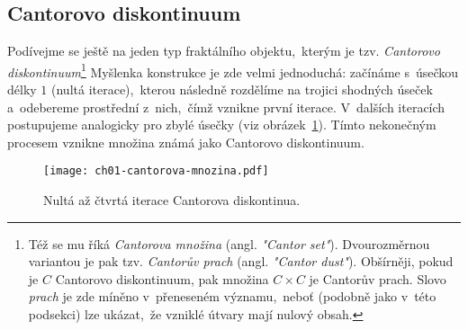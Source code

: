 \subsection{Cantorovo diskontinuum}\label{subsec:cantorovo_diskontinuum}
Podívejme se ještě na jeden typ fraktálního objektu,~kterým je tzv. \emph{Cantorovo diskontinuum}\footnote{Též se mu říká \emph{Cantorova množina} (angl. \emph{"Cantor set"}). Dvourozměrnou variantou je pak tzv. \emph{Cantorův prach} (angl. \emph{"Cantor dust"}). Obšírněji, pokud je $C$ Cantorovo diskontinuum, pak množina $C\times C$ je Cantorův prach. Slovo \emph{prach} je zde míněno v~přeneseném významu,~neboť (podobně jako v~této podsekci) lze ukázat,~že vzniklé útvary mají nulový obsah.} Myšlenka konstrukce je zde velmi jednoduchá: začínáme s~úsečkou délky $1$ (nultá iterace),~kterou následně rozdělíme na trojici shodných úseček a~odebereme prostřední z~nich,~čímž vznikne první iterace. V~dalších iteracích postupujeme analogicky pro zbylé úsečky (viz obrázek~\ref{fig:cantorovo_diskontinuum}). Tímto nekonečným procesem vznikne množina známá jako Cantorovo diskontinuum.
\begin{figure}[h]
    \centering
    \texttt{[image: ch01-cantorova-mnozina.pdf]}
    \caption{Nultá až čtvrtá iterace Cantorova diskontinua.}
    \label{fig:cantorovo_diskontinuum}
\end{figure}

